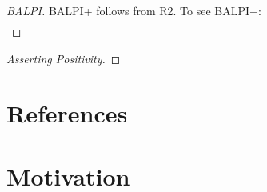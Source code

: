 \documentclass[preprint,leqno]{elsarticle}
\begin{document}
\begin{proof}[BALPI]

BALPI+ follows from R2. To see BALPI$-$:
\begin{align}

\end{align}


\end{proof}


\begin{proof}[Asserting Positivity]

\end{proof}

\section*{References}





\section{Motivation}
\end{document}
